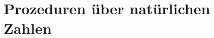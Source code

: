 
\chapter{Prozeduren über natürlichen Zahlen}
\label{cha:recursion-numbers}

\label{sec:factorial}

